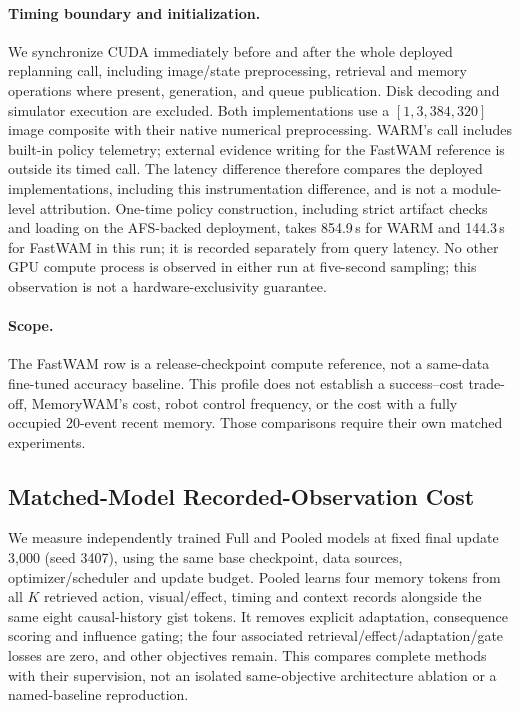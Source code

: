 \paragraph{Timing boundary and initialization.}
We synchronize CUDA immediately before and after the whole deployed replanning call, including image/state preprocessing, retrieval and memory operations where present, generation, and queue publication.
Disk decoding and simulator execution are excluded.
Both implementations use a $[1,3,384,320]$ image composite with their native numerical preprocessing.
WARM's call includes built-in policy telemetry; external evidence writing for the FastWAM reference is outside its timed call.
The latency difference therefore compares the deployed implementations, including this instrumentation difference, and is not a module-level attribution.
One-time policy construction, including strict artifact checks and loading on the AFS-backed deployment, takes 854.9\,s for WARM and 144.3\,s for FastWAM in this run; it is recorded separately from query latency.
No other GPU compute process is observed in either run at five-second sampling; this observation is not a hardware-exclusivity guarantee.

\paragraph{Scope.}
The FastWAM row is a release-checkpoint compute reference, not a same-data fine-tuned accuracy baseline.
This profile does not establish a success--cost trade-off, MemoryWAM's cost, robot control frequency, or the cost with a fully occupied 20-event recent memory.
Those comparisons require their own matched experiments.




\subsection{Matched-Model Recorded-Observation Cost}
\label{app:matched_cost}

We measure independently trained Full and Pooled models at fixed final update 3,000 (seed 3407), using the same base checkpoint, data sources, optimizer/scheduler and update budget.
Pooled learns four memory tokens from all $K$ retrieved action, visual/effect, timing and context records alongside the same eight causal-history gist tokens.
It removes explicit adaptation, consequence scoring and influence gating; the four associated retrieval/effect/adaptation/gate losses are zero, and other objectives remain.
This compares complete methods with their supervision, not an isolated same-objective architecture ablation or a named-baseline reproduction.


